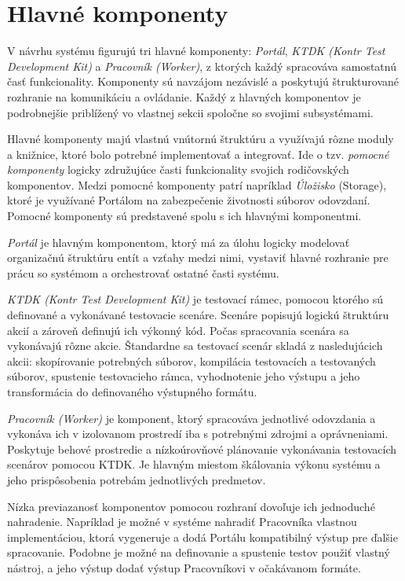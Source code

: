 \documentclass[
  digital, %
  oneside, %
  table,   %
  lof,     %
  lot,   %
]{fithesis3}
\begin{document}
\section{Hlavné komponenty}

V návrhu systému figurujú tri hlavné komponenty: \emph{Portál}, \emph{KTDK (Kontr Test Development Kit)} a \emph{Pracovník (Worker)}, z ktorých každý spracováva samostatnú časť funkcionality. Komponenty sú navzájom nezávislé a poskytujú štrukturované rozhranie na komunikáciu a ovládanie. Každý z hlavných komponentov je podrobnejšie priblížený vo vlastnej sekcii spoločne so svojimi subsystémami.

Hlavné komponenty majú vlastnú vnútornú štruktúru a využívajú rôzne moduly a knižnice, ktoré bolo potrebné implementovať a integrovať. Ide o tzv. \emph{pomocné komponenty} logicky združujúce časti funkcionality svojich rodičovských komponentov. Medzi pomocné komponenty patrí napríklad \textit{Úložisko} (Storage), ktoré je využívané Portálom na zabezpečenie životnosti súborov odovzdaní. Pomocné komponenty sú predstavené spolu s ich hlavnými komponentmi.

\emph{Portál} je hlavným komponentom, ktorý má za úlohu logicky modelovať organizačnú štruktúru entít a vzťahy medzi nimi, vystaviť hlavné rozhranie pre prácu so systémom a orchestrovať ostatné časti systému. 

\emph{KTDK (Kontr Test Development Kit)} je testovací rámec, pomocou ktorého sú definované a vykonávané testovacie scenáre. Scenáre popisujú logickú štruktúru akcií a zároveň definujú ich výkonný kód. Počas spracovania scenára sa vykonávajú rôzne akcie. Štandardne sa testovací scenár skladá z nasledujúcich akcii: skopírovanie potrebných súborov, kompilácia testovacích a testovaných súborov, spustenie testovacieho rámca, vyhodnotenie jeho výstupu a jeho transformácia do definovaného výstupného formátu. 

\emph{Pracovník (Worker)} je komponent, ktorý spracováva jednotlivé odovzdania a vykonáva ich v izolovanom prostredí iba s potrebnými zdrojmi a oprávneniami. Poskytuje behové prostredie a nízkoúrovňové plánovanie vykonávania testovacích scenárov pomocou KTDK. Je hlavným miestom škálovania výkonu systému a jeho prispôsobenia potrebám jednotlivých predmetov.

Nízka previazanosť komponentov pomocou rozhraní dovoľuje ich jednoduché nahradenie. Napríklad je možné v systéme nahradiť Pracovníka vlastnou implementáciou, ktorá vygeneruje a dodá Portálu kompatibilný výstup pre ďalšie spracovanie. Podobne je možné na definovanie a spustenie testov použiť vlastný nástroj, a jeho výstup dodať výstup Pracovníkovi v očakávanom formáte.
\end{document}
